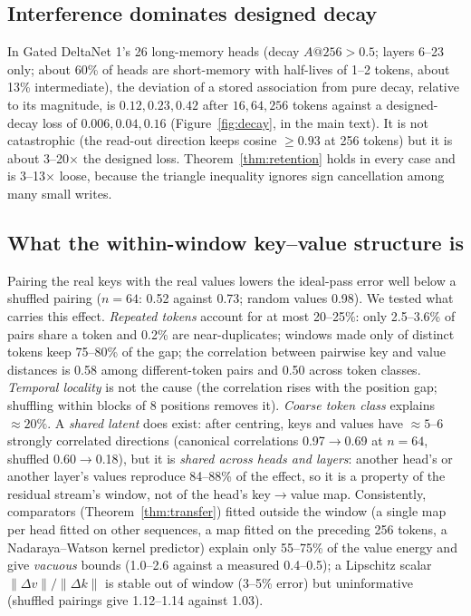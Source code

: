 \subsection{Interference dominates designed decay}
In Gated DeltaNet 1's 26 long-memory heads (decay $A@256>0.5$; layers 6--23 only; about 60\% of heads are short-memory with half-lives of 1--2 tokens, about 13\% intermediate), the deviation of a stored association from pure decay, relative to its magnitude, is $0.12,0.23,0.42$ after $16,64,256$ tokens against a designed-decay loss of $0.006,0.04,0.16$ (Figure~\ref{fig:decay}, in the main text). It is not catastrophic (the read-out direction keeps cosine $\ge0.93$ at 256 tokens) but it is about 3--20$\times$ the designed loss. Theorem~\ref{thm:retention} holds in every case and is 3--13$\times$ loose, because the triangle inequality ignores sign cancellation among many small writes.

\subsection{What the within-window key--value structure is}
Pairing the real keys with the real values lowers the ideal-pass error well below a shuffled pairing ($n=64$: 0.52 against 0.73; random values 0.98). We tested what carries this effect. \emph{Repeated tokens} account for at most 20--25\%: only 2.5--3.6\% of pairs share a token and 0.2\% are near-duplicates; windows made only of distinct tokens keep 75--80\% of the gap; the correlation between pairwise key and value distances is 0.58 among different-token pairs and 0.50 across token classes. \emph{Temporal locality} is not the cause (the correlation rises with the position gap; shuffling within blocks of 8 positions removes it). \emph{Coarse token class} explains $\approx20\%$. A \emph{shared latent} does exist: after centring, keys and values have $\approx5$--6 strongly correlated directions (canonical correlations 0.97$\to$0.69 at $n=64$, shuffled 0.60$\to$0.18), but it is \emph{shared across heads and layers}: another head's or another layer's values reproduce 84--88\% of the effect, so it is a property of the residual stream's window, not of the head's key$\to$value map. Consistently, comparators (Theorem~\ref{thm:transfer}) fitted outside the window (a single map per head fitted on other sequences, a map fitted on the preceding 256 tokens, a Nadaraya--Watson kernel predictor) explain only 55--75\% of the value energy and give \emph{vacuous} bounds (1.0--2.6 against a measured 0.4--0.5); a Lipschitz scalar $\|\Delta v\|/\|\Delta k\|$ is stable out of window (3--5\% error) but uninformative (shuffled pairings give 1.12--1.14 against 1.03).

